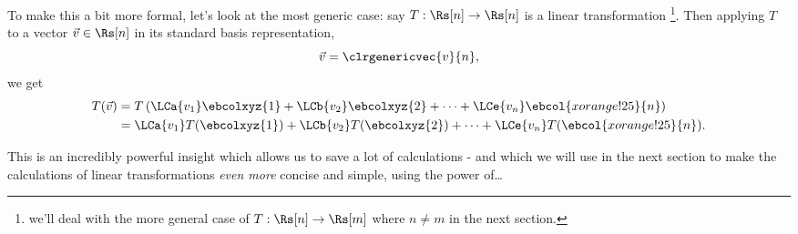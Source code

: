 To make this a bit more formal, let's look at the most generic case: say $T:\Rs[n]\to\Rs[n]$ is a linear transformation \footnote{we'll deal with the more general case of $T:\Rs[n]\to\Rs[m]$ where $n\neq m$ in the next section.}. Then applying $T$ to a vector $\vec{v}\in\Rs[n]$ in its standard basis representation, $$\vec{v}=\clrgenericvec{v}{n},$$ we get
\begin{equation}
	\begin{aligned}
		T(\vec{v}) & = T\left( \LCa{v_{1}}\ebcolxyz{1} + \LCb{v_{2}}\ebcolxyz{2} + \dots + \LCe{v_{n}}\ebcol{xorange!25}{n} \right) \\
		           & = \LCa{v_{1}}T(\ebcolxyz{1}) + \LCb{v_{2}}T(\ebcolxyz{2}) + \dots + \LCe{v_{n}}T(\ebcol{xorange!25}{n}).
	\end{aligned}
	\label{eq:}
\end{equation}

This is an incredibly powerful insight which allows us to save a lot of calculations - and which we will use in the next section to make the calculations of linear transformations \textit{even more} concise and simple, using the power of\dots %
